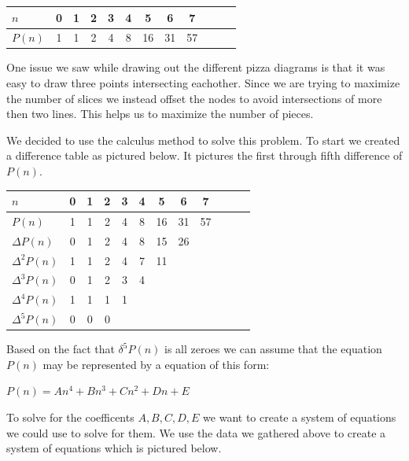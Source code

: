 \documentclass[10pt, AMS Euler]{article}
\begin{document}
	\begin{center}
		\begin{tabular}{l|ccccccccccc}\hline
			
			{\bf $n$ } & 0 & 1 & 2 & 3 & 4 & 5 & 6 & 7 \\
			\hline \hline
			{\bf $P(n)$} & 1 & 1 & 2 & 4 & 8 & 16 & 31 & 57  \\
		\end{tabular}
	\end{center}

	\bigskip
	\noindent One issue we saw while drawing out the different pizza diagrams is that it was easy to draw three points intersecting eachother. Since we are trying to maximize the number of slices we instead offset the nodes to avoid intersections of more then two lines. This helps us to maximize the number of pieces. 

	\bigskip
	\noindent We decided to use the calculus method to solve this problem. To start we created a difference table as pictured below. It pictures the first through fifth difference of $P(n)$.  

	\begin{center}
			\begin{tabular}{l|ccccccccccc}\hline
				
				{\bf $n$ } & 0 & 1 & 2 & 3 & 4 & 5 & 6 & 7 \\
				\hline \hline
				{\bf $P(n)$} & 1 & 1 & 2 & 4 & 8 & 16 & 31 & 57  \\
				$\Delta P(n)$ & 0 & 1 & 2 & 4 & 8 & 15 & 26 &   \\
				$\Delta^2P(n)$  & 1 & 1 & 2 & 4 & 7 & 11 &  &    \\
				$\Delta^3P(n)$  & 0  &  1  & 2 & 3 & 4 & &  &   \\
				$\Delta^4P(n)$  & 1  &  1  & 1 & 1 &  & &  &   \\
				$\Delta^5P(n)$  & 0  &  0  & 0 &  &  & &  &   \\
			\end{tabular}
		\end{center}
	
	\vspace{1em}

	\noindent Based on the fact that $\delta^5P(n)$ is all zeroes we can assume that the equation $P(n)$ may be represented by a equation of this form: 
	
	\bigskip
	$P(n) = An^4 +Bn^3 +Cn^2 + Dn + E$

	\bigskip
	\noindent To solve for the coefficents $A, B, C, D, E$ we want to create a system of equations we could use to solve for them. We use the data we gathered above to create a system of equations which is pictured below. 
\end{document}
